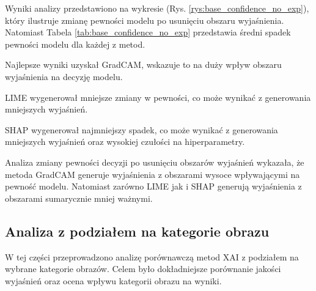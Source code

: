 Wyniki analizy przedstawiono na wykresie (Rys. \ref{rys:base_confidence_no_exp}), który ilustruje zmianę pewności modelu po usunięciu obszaru wyjaśnienia.
Natomiast Tabela \ref{tab:base_confidence_no_exp} przedstawia średni spadek pewności modelu dla każdej z metod.

Najlepsze wyniki uzyskał GradCAM, wskazuje to na duży wpływ obszaru wyjaśnienia na decyzję modelu.

LIME wygenerował mniejsze zmiany w pewności, co może wynikać z generowania mniejszych wyjaśnień.

SHAP wygenerował najmniejszy spadek, co może wynikać z generowania mniejszych wyjaśnień oraz wysokiej czułości na hiperparametry.

Analiza zmiany pewności decyzji po usunięciu obszarów wyjaśnień wykazała, że metoda GradCAM generuje wyjaśnienia z obszarami wysoce wpływającymi na pewność modelu.
Natomiast zarówno LIME jak i SHAP generują wyjaśnienia z obszarami sumarycznie mniej ważnymi.

\subsection*{Analiza z podziałem na kategorie obrazu}

W tej części przeprowadzono analizę porównawczą metod XAI z podziałem na wybrane kategorie obrazów.
Celem było dokładniejsze porównanie jakości wyjaśnień oraz ocena wpływu kategorii obrazu na wyniki.

